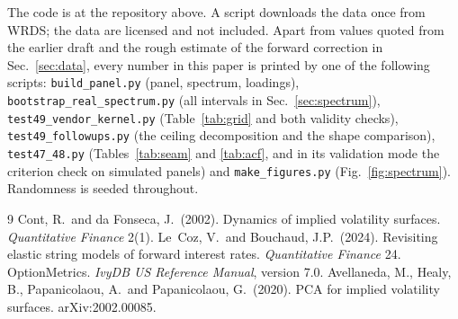 \documentclass[11pt]{article}
\begin{document}
\begin{sloppypar}
The code is at the repository above. A script downloads the data once from WRDS; the data are licensed and not included. Apart from values quoted from the earlier draft and the rough estimate of the forward correction in Sec.~\ref{sec:data}, every number in this paper is printed by one of the following scripts: \texttt{build\_panel.py} (panel, spectrum, loadings), \texttt{bootstrap\_real\_spectrum.py} (all intervals in Sec.~\ref{sec:spectrum}), \texttt{test49\_vendor\_kernel.py} (Table~\ref{tab:grid} and both validity checks), \texttt{test49\_followups.py} (the ceiling decomposition and the shape comparison), \texttt{test47\_48.py} (Tables~\ref{tab:seam} and \ref{tab:acf}, and in its validation mode the criterion check on simulated panels) and \texttt{make\_figures.py} (Fig.~\ref{fig:spectrum}). Randomness is seeded throughout.
\end{sloppypar}

\begin{thebibliography}{9}
 Cont, R.\ and da Fonseca, J.\ (2002). Dynamics of implied volatility surfaces. \emph{Quantitative Finance} 2(1).
 Le~Coz, V.\ and Bouchaud, J.P.\ (2024). Revisiting elastic string models of forward interest rates. \emph{Quantitative Finance} 24.
 OptionMetrics. \emph{IvyDB US Reference Manual}, version 7.0.
 Avellaneda, M., Healy, B., Papanicolaou, A.\ and Papanicolaou, G.\ (2020). PCA for implied volatility surfaces. arXiv:2002.00085.
\end{thebibliography}
\end{document}
